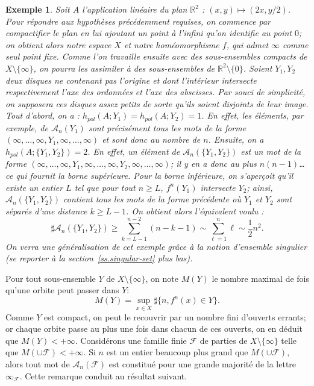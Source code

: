 \documentclass[11pt]{article}
\newtheorem*{exam*}{Exemple}
\theoremstyle{definition}
\numberwithin{equation}{section}
\numberwithin{figure}{section}
\numberwithin{table}{section}
\newcommand*\cA{{\mathcal A}}
\newcommand*\cF{{\mathcal F}}
\begin{document}
\begin{exam*}
Soit $A$ {l'application linéaire} du plan $\mathbb R^2$ : $(x,y) \mapsto (2x, y/2)$. Pour répondre aux hypothèses précédemment requises, on commence par compactifier le plan en lui ajoutant un point à l'infini qu'on identifie au point $0$; on obtient alors notre espace $X$ et notre homéomorphisme $f$, qui admet $\infty$ comme seul point fixe. Comme l'on travaille ensuite avec des sous-ensembles compacts de $X\setminus \{\infty\}$, on pourra les assimiler à des sous-ensembles de $\mathbb R ^2 \setminus \{0\}$. Soient $Y_1, Y_2$ deux disques ne contenant pas l'origine et dont l'intérieur intersecte respectivement l'axe des ordonnées et l'axe des abscisses. Par souci de simplicité, on supposera ces disques assez petits de sorte qu'ils soient disjoints de leur image. Tout d'abord, on a : $h_{pol}(A;Y_1)=h_{pol}(A;Y_2)=1$. En effet, les éléments, par exemple, de $\cA_n(Y_1)$ sont précisément tous les mots de la forme $(\infty, \dots, \infty, Y_1, \infty, \dots, \infty)$ et sont donc au nombre de $n$. Ensuite, on a $h_{pol}(A;\{Y_1, Y_2\})=2$. En effet, un élément de $\cA_n(\{Y_1, Y_2\})$ est un mot de la forme $(\infty, \dots, \infty, Y_1, \infty, \dots, \infty, Y_2, \infty, \dots, \infty)$; il y en a donc au plus $n(n-1)$\dots ce qui fournit la borne supérieure. Pour la borne inférieure, on s'aperçoit qu'il existe un entier $L$ tel que pour tout $n \geq L$, $f^n(Y_1)$ intersecte $Y_2$; ainsi, $\cA_n(\{Y_1, Y_2\})$ contient tous les mots de la forme précédente où $Y_1$ et $Y_2$ sont séparés d'une distance $k \geq L-1$. On obtient alors l'équivalent voulu :
\[
\sharp \cA_n(\{Y_1, Y_2\}) \geq \sum_{k=L-1}^{n-2} (n-k-1) \sim \sum_{\ell=1}^n \ell \sim \frac{1}{2} n^2.
\]
On verra une généralisation de cet exemple grâce à la notion d'\textit{ensemble singulier} (se reporter à la section~\ref{ss.singular-set} plus bas).
\end{exam*}



Pour tout sous-ensemble $Y$ de $X\setminus \{\infty\}$, on note $M(Y)$ le nombre maximal de fois qu'une orbite peut passer dans $Y$:
\[
M(Y) = \sup_{x \in X} \sharp \{n, f^n(x) \in Y \}.
\]
Comme $Y$ est compact, on peut le recouvrir par un nombre fini d'ouverts errants; or chaque orbite passe au plus une fois dans chacun de ces ouverts, on en déduit que $M(Y) < +\infty$. Considérons une famille finie $\cF$ de parties de $X\setminus \{\infty\}$ telle que $M(\cup \cF) < +\infty$. Si $n$ est un entier beaucoup plus grand que $M(\cup \cF)$, alors tout mot de $\cA_n(\cF)$ est constitué pour une grande majorité de la lettre $\infty_\cF$. Cette remarque conduit au résultat suivant.
\end{document}
